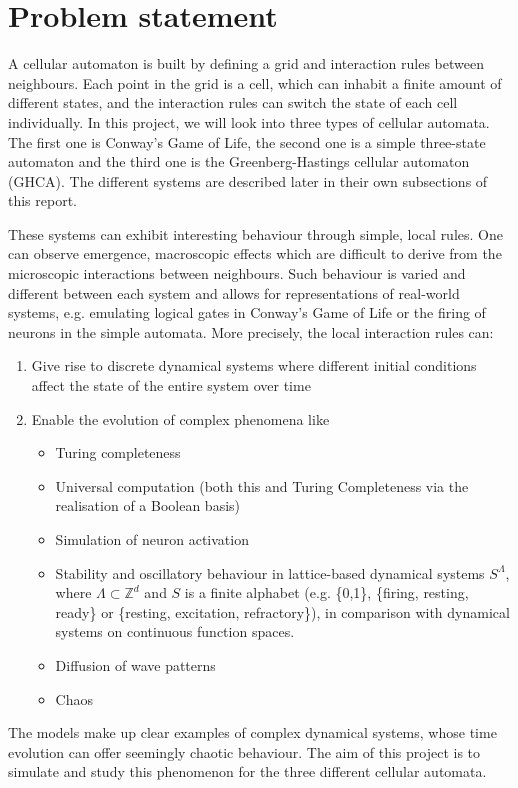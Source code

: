 \section{Problem statement}

A cellular automaton is built by defining a grid and interaction rules between neighbours. Each point in the grid is a cell, which can inhabit a finite amount of different states, and the interaction rules can switch the state of each cell individually. In this project, we will look into three types of cellular automata. The first one is Conway's Game of Life, the second one is a simple three-state automaton and the third one is the Greenberg-Hastings cellular automaton (GHCA). The different systems are described later in their own subsections of this report.

These systems can exhibit interesting behaviour through simple, local rules. One can observe emergence, macroscopic effects which are difficult to derive from the microscopic interactions between neighbours. Such behaviour is varied and different between each system and allows for representations of real-world systems, e.g. emulating logical gates in Conway's Game of Life or the firing of neurons in the simple automata. More precisely, the local interaction rules can:
\begin{enumerate}
\item Give rise to discrete dynamical systems where different initial conditions affect the state of the entire system over time
\item Enable the evolution of complex phenomena like
    \begin{itemize}
    \item Turing completeness
    \item Universal computation (both this and Turing Completeness via the realisation of a Boolean basis)
    \item Simulation of neuron activation
    \item Stability and oscillatory behaviour in lattice-based dynamical systems $S^\Lambda$, where $\Lambda \subset \mathbb{Z}^d$ and $S$ is a finite alphabet (e.g. \{0,1\}, \{firing, resting, ready\} or \{resting, excitation, refractory\}), in comparison with dynamical systems on continuous function spaces.
    \item Diffusion of wave patterns
    \item Chaos
    \end{itemize}
\end{enumerate}

The models make up clear examples of complex dynamical systems, whose time evolution can offer seemingly chaotic behaviour. The aim of this project is to simulate and study this phenomenon for the three different cellular automata.
